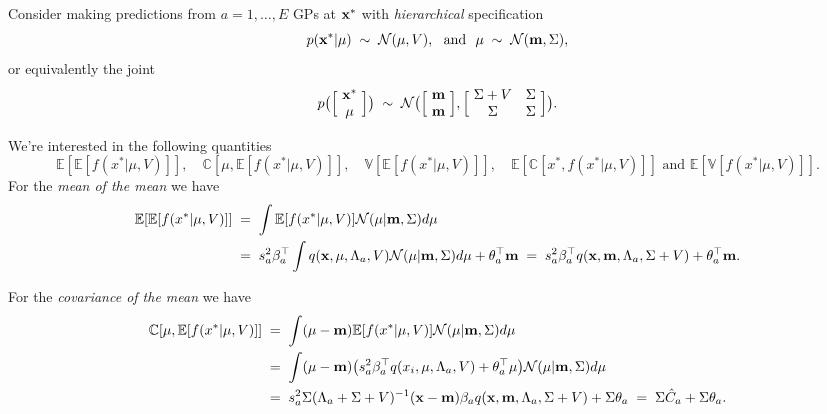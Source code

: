 \documentclass{article}
\newcommand{\bfm}{{\bf m}}
\newcommand{\bfx}{{\bf x}}
\newcommand{\E}{{\mathbb E}}
\newcommand{\V}{{\mathbb V}}
\newcommand{\C}{{\mathbb C}}
\begin{document}
Consider making predictions from $a=1,\ldots,E$ GPs at $\bfx^*$ with \emph{hierarchical} specification
\begin{equation}
p(\bfx^*|\mu)\;\sim\;{\cal N}(\mu, V),\text{\ \ and\ \ } \mu\;\sim\;{\cal N}(\bfm,\Sigma),
\end{equation}
%
or equivalently the joint
%
\begin{equation}
p\big(\Big[\!\begin{array}{c}\bfx^*\\
  \mu\end{array}\!\Big]\big)\;\sim\;{\cal
  N}\big(\Big[\!\begin{array}{c}\bfm\\
  \bfm\end{array}\!\Big],\Big[\!\begin{array}{cc}\Sigma+V&\Sigma\\ \Sigma&\Sigma\end{array}\!\Big]\big).
\end{equation}

We're interested in the following quantities
\begin{equation}
\E[\E[f(x^*|\mu,V)]],\quad\C[\mu,\E[f(x^*|\mu,V)]],\quad\V[\E[f(x^*|\mu,V)]],\quad\E[\C[x^*,f(x^*|\mu,V)]]
\text{\ \  and\ \ }\E[\V[f(x^*|\mu,V)]].
\end{equation}
%
For the \emph{mean of the mean} we have
\begin{equation}
\begin{split}
\E[\E[f(x^*|\mu,V)]]\;&=\;\int \E[f(x^*|\mu,V)] {\cal N}(\mu|\bfm,\Sigma)d\mu\\
&=\;s_a^2\beta_a^\top\int q({\bf x},\mu,\Lambda_a,V){\cal N}(\mu|\bfm,\Sigma)d\mu+\theta_a^\top \bfm
\;=\;s_a^2\beta_a^\top q(\bfx,\bfm,\Lambda_a,\Sigma+V)+\theta_a^\top \bfm.
\end{split}
\label{eq:mm}
\end{equation}

For the \emph{covariance of the mean} we have  
\begin{equation}
\begin{split}
\C[\mu,\E[f(x^*|\mu,V)]]\;&=\;\int (\mu-\bfm)\E[f(x^*|\mu,V)]{\cal N}(\mu|\bfm,\Sigma)d\mu\\
&=\;\int (\mu-\bfm)\big(s^2_a\beta_a^\top
q(x_i,\mu,\Lambda_a,V)+\theta_a^\top \mu\big){\cal N}(\mu|\bfm,\Sigma)d\mu\\
&=\;s^2_a\Sigma(\Lambda_a+\Sigma+V)^{-1}(\bfx-\bfm)\beta_aq(\bfx,\bfm,\Lambda_a,\Sigma+V)
+\Sigma\theta_a\;=\;\Sigma\hat C_a+\Sigma\theta_a.  
\end{split}
\label{eq:cm}
\end{equation}
 
\end{document}
